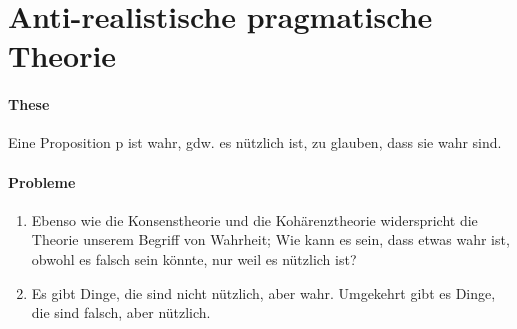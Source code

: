 \documentclass[../main.tex]{subfiles}
\begin{document}
\section{Anti-realistische pragmatische Theorie}
\paragraph{These} Eine Proposition p ist wahr, gdw. es nützlich ist, zu glauben, dass sie wahr sind.
\paragraph{Probleme}
\begin{enumerate}
	\item Ebenso wie die Konsenstheorie und die Kohärenztheorie widerspricht die Theorie unserem Begriff von Wahrheit; Wie kann es sein, dass etwas wahr ist, obwohl es falsch sein könnte, nur weil es nützlich ist?
	\item Es gibt Dinge, die sind nicht nützlich, aber wahr. Umgekehrt gibt es Dinge, die sind falsch, aber nützlich. 
\end{enumerate}
\end{document}
